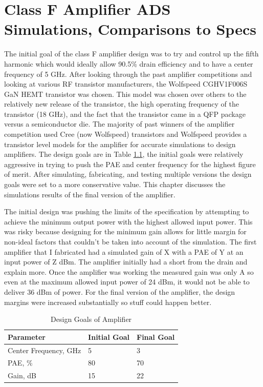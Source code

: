 \chapter{Class F Amplifier ADS Simulations, Comparisons to Specs}

The initial goal of the class F amplifier design was to try and control up the fifth harmonic which would ideally allow 90.5\% drain efficiency and to have a center frequency of 5 GHz. After looking through the past amplifier competitions and looking at various RF transistor manufacturers, the Wolfspeed CGHV1F006S GaN HEMT transistor was chosen. This model was chosen over others to the relatively new release of the transistor, the high operating frequency of the transistor (18 GHz), and the fact that the transistor came in a QFP package versus a semiconductor die. The majority of past winners of the amplifier competition used Cree (now Wolfspeed) transistors and Wolfspeed provides a transistor level models for the amplifier for accurate simulations to design amplifiers. The design goals are in Table \ref{table:design_goal}, the initial goals were relatively aggressive in trying to push the PAE and center frequency for the highest figure of merit. After simulating, fabricating, and testing multiple versions the design goals were set to a more conservative value. This chapter discusses the simulations results of the final version of the amplifier.

The initial design was pushing the limits of the specification by attempting to achieve the minimum output power with the highest allowed input power. This was risky because designing for the minimum gain allows for little margin for non-ideal factors that couldn't be taken into account of the simulation. The first amplifier that I fabricated had a simulated gain of X with a PAE of Y at an input power of Z dBm. The amplifier initially had a short from the drain and explain more. Once the amplifier was working the measured gain was only A so even at the maximum allowed input power of 24 dBm, it would not be able to deliver 36 dBm of power. For the final version of the amplifier, the design margins were increased substantially so stuff could happen better.


\begin{table}
    \centering
    \caption{Design Goals of Amplifier}
    \label{table:design_goal}
    \begin{tabular}{|l|l|l|}
      \hline
      {Parameter} & {Initial Goal}     & {Final Goal} \\ \hline
      {Center Frequency, GHz} & 5    & 3 \\ \hline
      {PAE, \%}               & 80 & 70 \\ \hline
      {Gain, dB}              & 15 & 22 \\ \hline
    \end{tabular}
\end{table}

